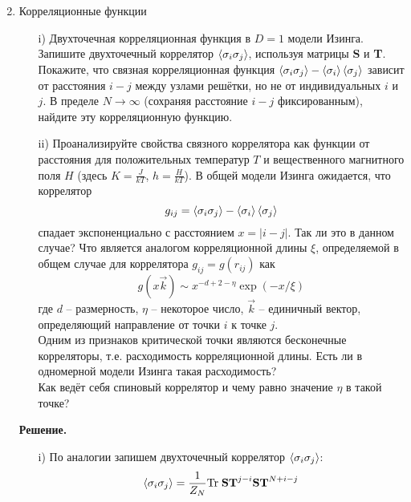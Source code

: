 \documentclass[12pt]{article}
\theoremstyle{definition}
\begin{document}
\begin{enumerate}
\begin{itemize}
\begin{equation}
    \end{equation}
    \end{itemize}
    \item Корреляционные функции
    \begin{itemize}
        \item[i)] Двухточечная корреляционная функция в $D=1$ модели Изинга. Запишите двухточечный коррелятор $\braket{\sigma_i\sigma_j}$, используя матрицы \textbf{S} и \textbf{T}. Покажите, что связная корреляционная функция $\braket{\sigma_i\sigma_j}-\braket{\sigma_i}\braket{\sigma_j}$ зависит от расстояния $i-j$ между узлами решётки, но не от индивидуальных $i$ и $j$. В пределе $N\rightarrow\infty$ (сохраняя расстояние $i-j$ фиксированным), найдите эту корреляционную функцию.
        \item[ii)] Проанализируйте свойства связного коррелятора как функции от расстояния для положительных температур $T$ и вещественного магнитного поля $H$ (здесь $K=\frac{J}{kT}$, $h=\frac{H}{kT}$). В общей модели Изинга ожидается, что коррелятор
        \begin{equation}
            g_{ij}=\braket{\sigma_i\sigma_j}-\braket{\sigma_i}\braket{\sigma_j}
        \end{equation}
        спадает экспоненциально с расстоянием $x=|i-j|$. Так ли это в данном случае? Что является аналогом корреляционной длины $\xi$, определяемой в общем случае для коррелятора $g_{ij}=g(r_{ij})$ как
        \begin{equation}
            g(x\Vec{k})\sim x^{-d+2-\eta}\exp(-x/\xi)
        \end{equation}
        где $d$ -- размерность, $\eta$ -- некоторое число, $\Vec{k}$ -- единичный вектор, определяющий направление от точки $i$ к точке $j$.\\
        Одним из признаков критической точки являются бесконечные корреляторы, т.е. расходимость корреляционной длины. Есть ли в одномерной модели Изинга такая расходимость?\\
        Как ведёт себя спиновый коррелятор и чему равно значение $\eta$ в такой точке?
    \end{itemize}
    \textbf{Решение.}
    \begin{itemize}
    \item[i)] По аналогии запишем двухточечный коррелятор $\braket{\sigma_i\sigma_j}$:
        \begin{equation}
            \braket{\sigma_i\sigma_j}=\frac{1}{Z_N}\text{Tr}\;\textbf{S}\textbf{T}^{j-i}\textbf{S}\textbf{T}^{N+i-j}
        \end{equation}

\end{itemize}
\end{enumerate}
\end{document}
